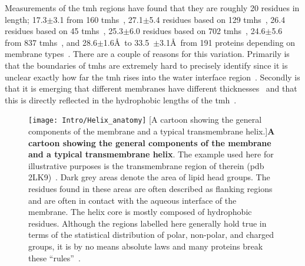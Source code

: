 Measurements of the \gls{tmh} regions have found that they are roughly 20 residues in length; 17.3$\pm$3.1 from 160 \gls{tmh}s~\cite{Hildebrand2004}, 27.1$\pm$5.4 residues based on 129 \gls{tmh}s~\cite{Ulmschneider2001}, 26.4 residues based on 45 \gls{tmh}s~\cite{Bowie1997}, 25.3$\pm$6.0 residues based on 702 \gls{tmh}s~\cite{Cuthbertson2005a}, 24.6$\pm$5.6 from 837 \gls{tmh}s~\cite{Baeza-Delgado2013}, and 28.6$\pm$1.6\AA~to 33.5~$\pm$3.1\AA~from 191 proteins depending on membrane types~\cite{Pogozheva2013}.
There are a couple of reasons for this variation.
Primarily is that the boundaries of \gls{tmh}s are extremely hard to precisely identify since it is unclear exactly how far the \gls{tmh} rises into the water interface region~\cite{VonHeijne2006}.
Secondly is that it is emerging that different membranes have different thicknesses~\cite{VanMeer2008} and that this is directly reflected in the hydrophobic lengths of the \gls{tmh}~\cite{Sharpe2010, Pogozheva2013}.

\begin{figure}[ht]
\centering
\texttt{[image: Intro/Helix\_anatomy]}
		[A cartoon showing the general components of the membrane and a typical transmembrane helix.]{\textbf{A cartoon showing the general components of the membrane and a typical transmembrane helix}.
		The example used here for illustrative purposes is the transmembrane region of therein (\gls{pdb} 2LK9)~\cite{Skasko2012}.
		Dark grey areas denote the area of lipid head groups.
		The residues found in these areas are often described as flanking regions and are often in contact with the aqueous interface of the membrane.
		The helix core is mostly composed of hydrophobic residues.
		Although the regions labelled here generally hold true in terms of the statistical distribution of polar, non-polar, and charged groups, it is by no means absolute laws and many proteins break these ``rules''~\cite{Sharpe2010, Baeza-Delgado2013, Pogozheva2013}.}

\label{fig:helixcartoon1}
\end{figure}



